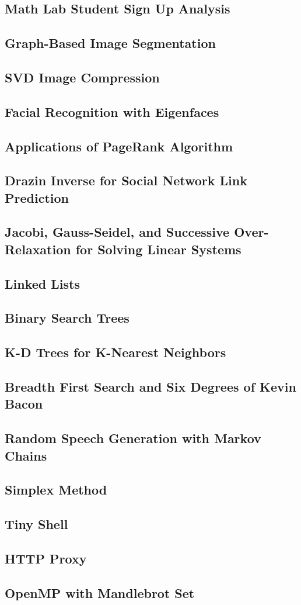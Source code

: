 \documentclass[11pt, letterpaper]{article}
\begin{document}
  \subsection*{Math Lab Student Sign Up Analysis}
  \subsection*{Graph-Based Image Segmentation}
  \subsection*{SVD Image Compression}
  \subsection*{Facial Recognition with Eigenfaces}
  \subsection*{Applications of PageRank Algorithm}
  \subsection*{Drazin Inverse for Social Network Link Prediction}
  \subsection*{Jacobi, Gauss-Seidel, and Successive Over-Relaxation for Solving Linear Systems}
  \subsection*{Linked Lists}
  \subsection*{Binary Search Trees}
  \subsection*{K-D Trees for K-Nearest Neighbors}
  \subsection*{Breadth First Search and Six Degrees of Kevin Bacon}
  \subsection*{Random Speech Generation with Markov Chains}
  \subsection*{Simplex Method}
  \subsection*{}
  \subsection*{Tiny Shell}
  \subsection*{HTTP Proxy}
  \subsection*{OpenMP with Mandlebrot Set}
\end{document}
